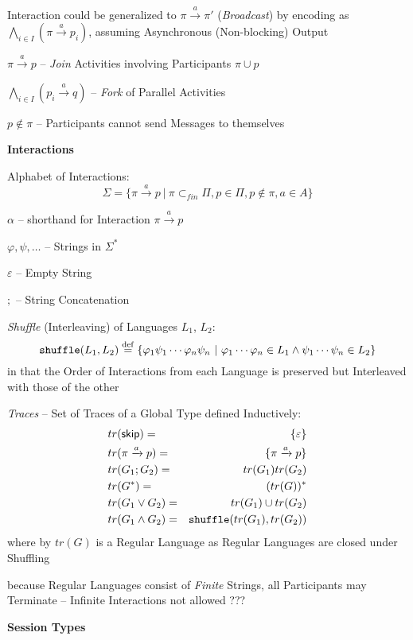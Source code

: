 Interaction could be generalized to $\pi \xrightarrow{a} \pi'$
(\emph{Broadcast}) by encoding as $\bigwedge_{i \in I} (\pi
\xrightarrow{a} p_i)$, assuming Asynchronous (Non-blocking) Output

$\pi \xrightarrow{a} p$ -- \emph{Join} Activities involving
Participants $\pi \cup {p}$

$\bigwedge_{i \in I} (p_i \xrightarrow{a} q)$ -- \emph{Fork} of
Parallel Activities

$p \notin \pi$ -- Participants cannot send Messages to themselves


\textbf{Interactions}

Alphabet of Interactions:
\[
  \Sigma = \{ \pi \xrightarrow{a} p
    \ |\ \pi \subset_{fin} \Pi, p \in \Pi, p \notin \pi, a \in A \}
\]

$\alpha$ -- shorthand for Interaction $\pi \xrightarrow{a} p$

$\varphi, \psi, \ldots$ -- Strings in $\Sigma^*$

$\varepsilon$ -- Empty String

$;$ -- String Concatenation

\emph{Shuffle} (Interleaving) of Languages $L_1$, $L_2$:
\[
  \mathtt{shuffle}(L_1, L_2) \stackrel{\mathrm{def}}= \{ \varphi_1\psi_1 \cdots
    \varphi_n\psi_n \ |\ \varphi_1 \cdots \varphi_n \in L_1 \wedge
    \psi_1 \cdots \psi_n \in L_2
  \}
\]
in that the Order of Interactions from each Language is preserved but
Interleaved with those of the other

\emph{Traces} -- Set of Traces of a Global Type defined Inductively:
\begin{align*}
  & tr(\mathsf{skip}) =& \{ \varepsilon \} \\
  & tr(\pi \xrightarrow{a} p) =& \{ \pi \xrightarrow{a} p \} \\
  & tr(G_1;G_2) =& tr(G_1)tr(G_2) \\
  & tr(G^*) =& (tr(G))^* \\
  & tr(G_1 \vee G_2) =& tr(G_1) \cup tr(G_2) \\
  & tr(G_1 \wedge G_2) =& \mathtt{shuffle} (tr(G_1), tr(G_2)) \\
\end{align*}
where by $tr(G)$ is a Regular Language as Regular Languages are closed
under Shuffling

because Regular Languages consist of \emph{Finite} Strings, all
Participants may Terminate -- Infinite Interactions not allowed ???


\textbf{Session Types}

